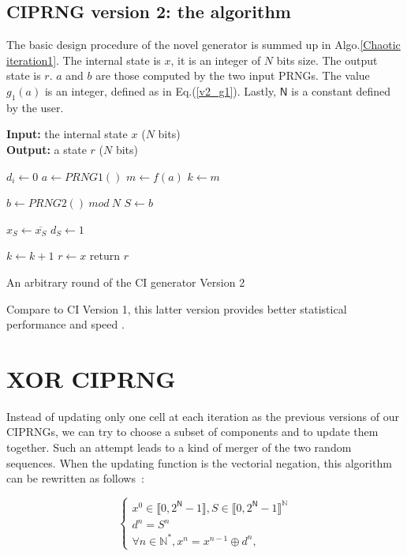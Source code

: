 \subsection{CIPRNG version 2: the algorithm}

The basic design procedure of the novel generator is summed up in Algo.\ref{Chaotic iteration1}.
The internal state is $x$, it is an integer of $N$ bits size. The output state is $r$. $a$ and $b$ are those computed by the two input
PRNGs. The value $g_1(a)$ is an integer, defined as in Eq.(\ref{v2_g1}). Lastly, $\mathsf{N}$ is a constant 
defined by the user.
\begin{algorithm}
\textbf{Input:} the internal state $x$ ($N$ bits)\\
\textbf{Output:} a state $r$ ($N$ bits)\\
\begin{algorithmic}[1]
{
\STATE$d_i\leftarrow{0}$\;
}
\ENDFOR
\STATE$a\leftarrow{PRNG1()}$\;
\STATE$m\leftarrow{f(a)}$\;
\STATE$k\leftarrow{m}$\;

\STATE$b\leftarrow{PRNG2()~mod~N}$\;
\STATE$S\leftarrow{b}$\;
    {
\STATE      $x_S\leftarrow{ \overline{x_S}}$\;
\STATE      $d_S\leftarrow{1}$\;
    
    }
    {
\STATE      $k\leftarrow{ k+1}$\;
    }\ENDIF
\ENDWHILE
$r\leftarrow{x}$\;
return $r$\;
\medskip
\caption{An arbitrary round of the CI generator Version 2}
\label{Chaotic iteration1}
\end{algorithmic}
\end{algorithm}

Compare to CI Version 1, this latter version provides better statistical performance and speed \cite{bfgw11:ij}.


\section{XOR CIPRNG}
Instead of updating only one cell at each iteration as the previous versions of
our CIPRNGs, we can try to choose a subset of components and to update them together. Such an attempt leads
to a kind of merger of the two random sequences. When the updating function is the vectorial 
negation, this algorithm can be rewritten as follows~\cite{DBLP:journals/corr/abs-1112-5239}:

\begin{equation}
\left\{
\begin{array}{l}
x^0 \in \llbracket 0, 2^\mathsf{N}-1 \rrbracket, S \in \llbracket 0, 2^\mathsf{N}-1 \rrbracket^\mathds{N} \\
d^n = S^n\\
\forall n \in \mathds{N}^*, x^n = x^{n-1} \oplus d^n,
\end{array}
\right.
\label{equation Oplus1}
\end{equation}

